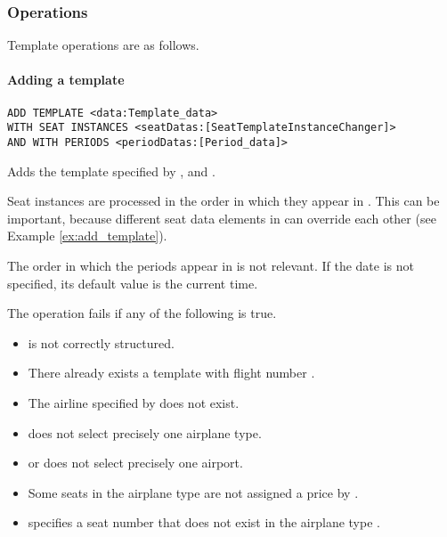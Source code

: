 \begin{description}
    \begin{texa}
    \end{texa}
    \begin{texa}
    \end{texa}
\end{description}


\subsubsection{Operations}
Template operations are as follows.
\paragraph{Adding a template}
\begin{operation}
  \label{op:add_template}
  \begin{lstlisting}
ADD TEMPLATE <data:Template_data>
WITH SEAT INSTANCES <seatDatas:[SeatTemplateInstanceChanger]>
AND WITH PERIODS <periodDatas:[Period_data]>
  \end{lstlisting}
\end{operation}
Adds the template specified by ,  and
.

Seat instances are processed in the order in which they appear in
. This can be important, because different seat data elements in
 can override each other (see Example \ref{ex:add_template}).

The order in which the periods appear in  is not relevant. If
the date  is not specified, its default value is the
current time.


The operation fails if any of the following is true.
\begin{itemize}
  \item {} is not correctly structured.
  \item There already exists a template with flight number .
  \item The airline specified by  does not exist.
  \item {} does not select precisely one airplane type.
  \item {} or  does not select precisely one airport.
  \item Some seats in the airplane type  are not assigned a price
    by .
  \item {} specifies a seat number that does not exist in the
    airplane type .
\end{itemize}

